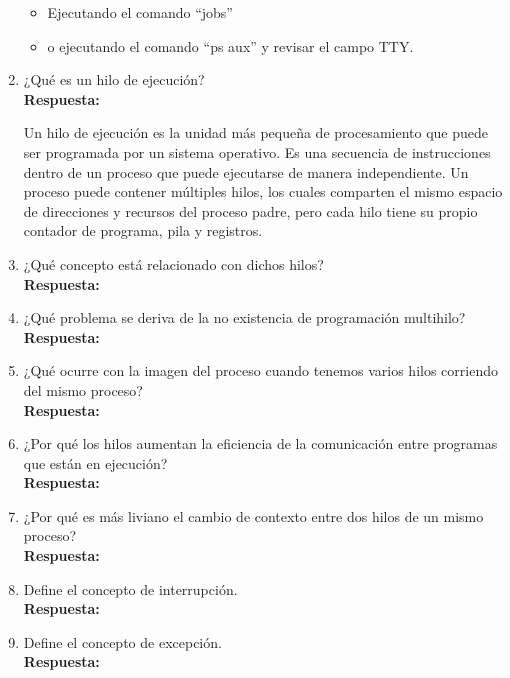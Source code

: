 \documentclass[a4paper,12pt]{article}
\begin{document}
\begin{enumerate}[label=\textbf{Pregunta \arabic*.}]
    \begin{itemize}
        \item Ejecutando el comando “jobs”

        \item o ejecutando el comando “ps aux” y revisar el campo TTY.
    \end{itemize}

    \item ¿Qué es un hilo de ejecución? \\ %
    \textbf{Respuesta:} 
    
    Un hilo de ejecución es la unidad más pequeña de procesamiento que puede ser programada por un sistema operativo. Es una secuencia de instrucciones dentro de un proceso que puede ejecutarse de manera independiente. Un proceso puede contener múltiples hilos, los cuales comparten el mismo espacio de direcciones y recursos del proceso padre, pero cada hilo tiene su propio contador de programa, pila y registros.

    \item ¿Qué concepto está relacionado con dichos hilos? \\ %
    \textbf{Respuesta:} 
    


    \item ¿Qué problema se deriva de la no existencia de programación multihilo? \\ %
    \textbf{Respuesta:} 
    

    \item ¿Qué ocurre con la imagen del proceso cuando tenemos varios hilos corriendo del mismo proceso? \\
    \textbf{Respuesta:} 
    

    \item ¿Por qué los hilos aumentan la eficiencia de la comunicación entre programas que están en ejecución? \\
    \textbf{Respuesta:} 
    

    \item ¿Por qué es más liviano el cambio de contexto entre dos hilos de un mismo proceso? \\
    \textbf{Respuesta:} 
    

    \item Define el concepto de interrupción. \\
    \textbf{Respuesta:} 
    

    \item Define el concepto de excepción. \\
    \textbf{Respuesta:} 
    


\end{enumerate}
\end{document}

